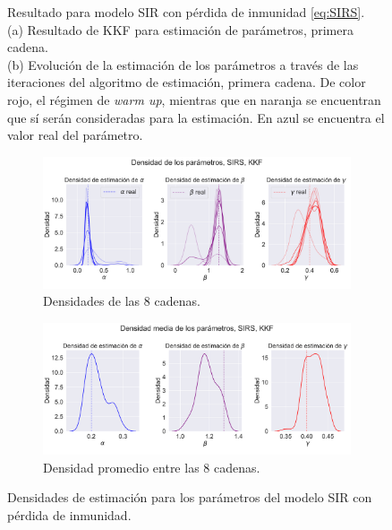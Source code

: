 \begin{figure}[h!]
\begin{subfigure}[b]{0.49\textwidth}
         \caption{}
         \label{fig:nonlinear_filters_sirs_params_evolution}
    \end{subfigure}
    \caption{Resultado para modelo SIR con pérdida de inmunidad \eqref{eq:SIRS}. \\
    (a) Resultado de KKF para estimación de parámetros, primera cadena. \\
    (b) Evolución de la estimación de los parámetros a través de las iteraciones del algoritmo de estimación, primera cadena. De color rojo, el régimen de \textit{warm up}, mientras que en naranja se encuentran que sí serán consideradas para la estimación. En azul se encuentra el valor real del parámetro.}
    \label{fig:SIR_inmun}
\end{figure}

\begin{figure}[h]
    \centering
    \begin{subfigure}[b]{0.8\textwidth}
        \centering \includegraphics[width=0.8\linewidth]{img/content/chapter4/nonlinear_filters_sirs_params_density.pdf}
    \caption{Densidades de las 8 cadenas.}
    \label{fig:nonlinear_filters_sirs_params_density}
    \end{subfigure}
    \begin{subfigure}[b]{0.8\textwidth}
        \centering \includegraphics[width=0.8\linewidth]{img/content/chapter4/nonlinear_filters_sirs_params_density_mean.pdf}
    \caption{Densidad promedio entre las 8 cadenas.}
    \label{fig:nonlinear_filters_sirs_params_density_mean}
    \end{subfigure}
    \caption{Densidades de estimación para los parámetros del modelo SIR con pérdida de inmunidad.}
\end{figure}

